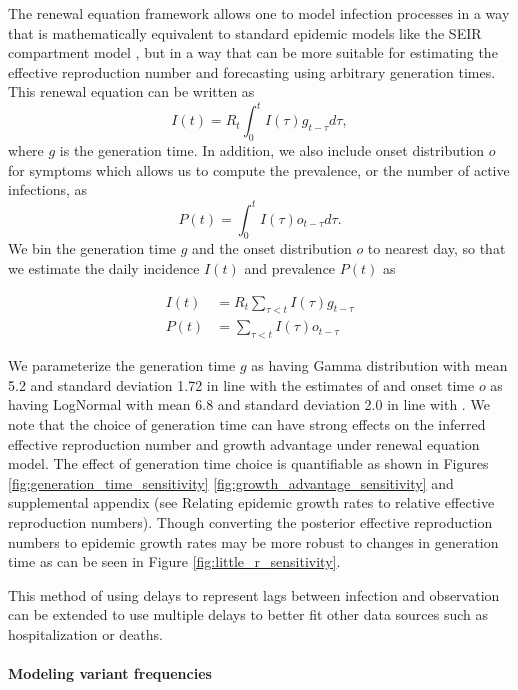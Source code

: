 \documentclass[11pt,oneside,letterpaper]{article}
\begin{document}
The renewal equation framework allows one to model infection processes in a way that is mathematically equivalent to standard epidemic models like the SEIR compartment model \cite{Champredon2018}, but in a way that can be more suitable for estimating the effective reproduction number and forecasting using arbitrary generation times. This renewal equation can be written as
\begin{equation}
  I(t) = R_{t} \int_{0}^{t} I(\tau)g_{t-\tau} d\tau,
\end{equation}
where $g$ is the generation time.
In addition, we also include onset distribution $o$ for symptoms which allows us to compute the prevalence, or the number of active infections, as
\begin{equation}
  P(t) = \int_{0}^{t} I(\tau) o_{t-\tau} d \tau.
\end{equation}
We bin the generation time $g$ and the onset distribution $o$ to nearest day, so that we estimate the daily incidence $I(t)$ and prevalence $P(t)$ as

\begin{align}
  I(t) &= R_{t} \sum_{\tau < t} I(\tau) g_{t-\tau}\\
  P(t) &= \sum_{\tau < t} I(\tau) o_{t-\tau}
\end{align}

We parameterize the generation time $g$ as having Gamma distribution with mean 5.2 and standard deviation 1.72 in line with the estimates of \cite{Ganyani2020} and onset time $o$ as having LogNormal with mean 6.8 and standard deviation 2.0 in line with \cite{Cheng2021}. 
We note that the choice of generation time can have strong effects on the inferred effective reproduction number and growth advantage under renewal equation model. 
The effect of generation time choice is quantifiable as shown in Figures \ref{fig:generation_time_sensitivity} \ref{fig:growth_advantage_sensitivity} and supplemental appendix (see Relating epidemic growth rates to relative effective reproduction numbers). 
Though converting the posterior effective reproduction numbers to epidemic growth rates may be more robust to changes in generation time as can be seen in Figure \ref{fig:little_r_sensitivity}.

This method of using delays to represent lags between infection and observation can be extended to use multiple delays to better fit other data sources such as hospitalization or deaths.

\paragraph{Modeling variant frequencies}%
\end{document}
